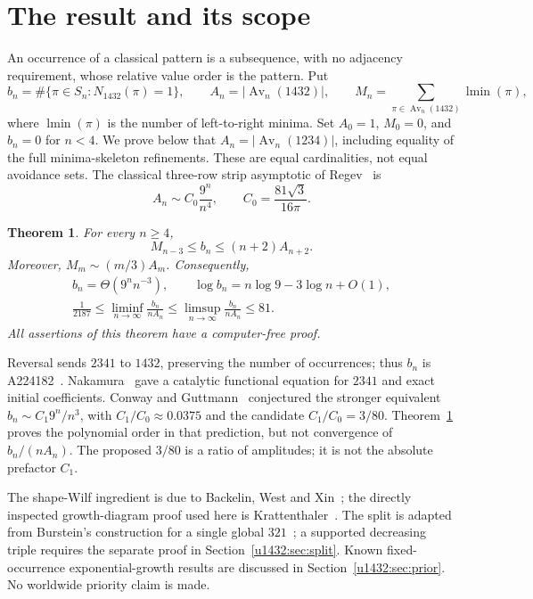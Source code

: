 \documentclass[11pt]{article}
\newtheorem{theorem}{Theorem}[section]
\theoremstyle{remark}\newtheorem{remark}[theorem]{Remark}
\newcommand{\Av}{\operatorname{Av}}
\newcommand{\lm}{\operatorname{lmin}}
\begin{document}
\section{The result and its scope}
An occurrence of a classical pattern is a subsequence, with no adjacency
requirement, whose relative value order is the pattern. Put
\[
 b_n=\#\{\pi\in S_n:N_{1432}(\pi)=1\},\qquad
 A_n=|\Av_n(1432)|,
 \qquad M_n=\sum_{\pi\in\Av_n(1432)}\lm(\pi),
\]
where $\lm(\pi)$ is the number of left-to-right minima. Set $A_0=1$,
$M_0=0$, and $b_n=0$ for $n<4$. We prove below that
$A_n=|\Av_n(1234)|$, including equality of the full minima-skeleton
refinements. These are equal cardinalities, not equal avoidance sets.
The classical three-row strip asymptotic of Regev~\cite{Regev} is
\begin{equation}\label{u1432:eq:regev}
 A_n\sim C_0\frac{9^n}{n^4},\qquad C_0=\frac{81\sqrt3}{16\pi}.
\end{equation}

\begin{theorem}\label{u1432:thm:main}
For every $n\ge4$,
\begin{equation}\label{u1432:eq:finite}
 M_{n-3}\le b_n\le (n+2)A_{n+2}.
\end{equation}
Moreover, $M_m\sim(m/3)A_m$. Consequently,
\begin{gather}\label{u1432:eq:theta}
 b_n=\Theta(9^n n^{-3}),\qquad
 \log b_n=n\log9-3\log n+O(1),\\
 \frac1{2187}\le\liminf_{n\to\infty}\frac{b_n}{nA_n}
 \le\limsup_{n\to\infty}\frac{b_n}{nA_n}\le81.\label{u1432:eq:ratio}
\end{gather}
All assertions of this theorem have a computer-free proof.
\end{theorem}

Reversal sends $2341$ to $1432$, preserving the number of occurrences;
thus $b_n$ is A224182~\cite{OEIS}. Nakamura~\cite[Section 3.2,
Theorem 4]{Nakamura} gave a catalytic functional equation for $2341$ and
exact initial coefficients. Conway and Guttmann~\cite[Section 5.3]{CG}
conjectured the stronger equivalent $b_n\sim C_1 9^n/n^3$, with
$C_1/C_0\approx0.0375$ and the candidate $C_1/C_0=3/80$.
Theorem~\ref{u1432:thm:main} proves the polynomial order in that prediction,
but not convergence of $b_n/(nA_n)$. The proposed $3/80$ is a ratio of
amplitudes; it is not the absolute prefactor $C_1$.

The shape-Wilf ingredient is due to Backelin, West and Xin~\cite{BWX};
the directly inspected growth-diagram proof used here is
Krattenthaler~\cite[Theorems 1--3]{Kratt}. The split is adapted from
Burstein's construction for a single global $321$~\cite{Burstein}; a
supported decreasing triple requires the separate proof in
Section~\ref{u1432:sec:split}. Known fixed-occurrence exponential-growth
results are discussed in Section~\ref{u1432:sec:prior}. No worldwide priority
claim is made.
\end{document}
